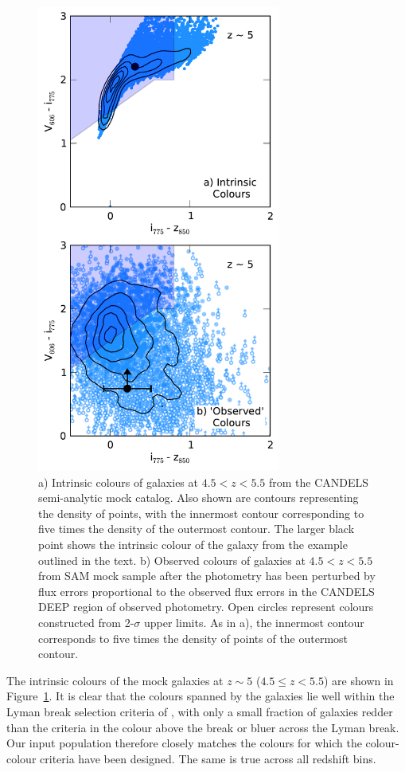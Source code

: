 \begin{figure}
\centering
\includegraphics[width=80mm]{plots/figA1.pdf}
\caption[Short caption]{a) Intrinsic colours of galaxies at $4.5 < z < 5.5$ from the CANDELS semi-analytic mock catalog. Also shown are contours representing the density of points, with the innermost contour corresponding to five times the density of the outermost contour. The larger black point shows the intrinsic colour of the galaxy from the example outlined in the text. b) Observed colours of galaxies at $4.5 < z < 5.5$ from SAM mock sample after the photometry has been perturbed by flux errors proportional to the observed flux errors in the CANDELS DEEP region of observed photometry. Open circles represent colours constructed from 2-$\sigma$ upper limits. As in a), the innermost contour corresponds to five times the density of points of the outermost contour.}
\label{fig:mock_col}
\end{figure}

The intrinsic colours of the mock galaxies at $z \sim 5$ ($4.5 \leq z < 5.5$) are shown in Figure~\ref{fig:mock_col}. It is clear that the colours spanned by the galaxies lie well within the Lyman break selection criteria of \citet{2007ApJ...670..928B}, with only a small fraction of galaxies redder than the criteria in the colour above the break or bluer across the Lyman break. Our input population therefore closely matches the colours for which the colour-colour criteria have been designed. The same is true across all redshift bins. 

